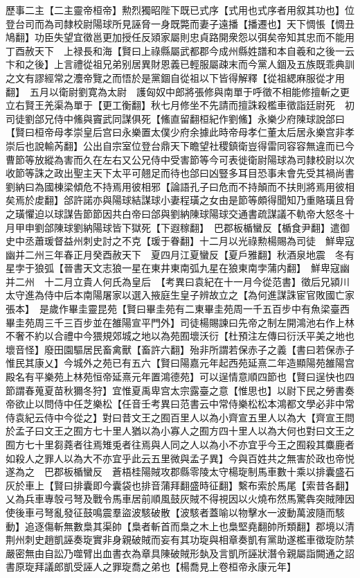 歷事二主【二主靈帝桓帝】勲烈獨昭陛下既已式序【式用也式序者用叙其功也】位登台司而為司隸校尉陽球所見誣脅一身既斃而妻子遠播【播遷也】天下惆悵【惆丑鳩翻】功臣失望宜徵邕更加授任反熲家屬則忠貞路開衆怨以弭矣帝知其忠而不能用　丁酉赦天下　上禄長和海【賢曰上祿縣屬武都郡今成州縣姓譜和本自羲和之後一云卞和之後】上言禮從祖兄弟别居異財恩義已輕服屬疎末而今黨人錮及五族既乖典訓之文有謬經常之灋帝覽之而悟於是黨錮自從祖以下皆得解釋【從祖緦麻服從才用翻】　五月以衛尉劉寛為太尉　護匈奴中郎將張修與南單于呼徵不相能修擅斬之更立右賢王羌渠為單于【更工衡翻】秋七月修坐不先請而擅誅殺檻車徵詣廷尉死　初司徒劉郃兄侍中鯈與竇武同謀俱死【鯈直留翻桓紀作劉鯈】永樂少府陳球說郃曰【賢曰桓帝母孝崇皇后宫曰永樂置太僕少府余據此時帝母孝仁董太后居永樂宫非孝崇后也說輸芮翻】公出自宗室位登台鼎天下瞻望社稷鎮衛豈得雷同容容無違而已今曹節等放縱為害而久在左右又公兄侍中受害節等今可表徙衛尉陽球為司隸校尉以次收節等誅之政出聖主天下太平可翹足而待也郃曰凶豎多耳目恐事未會先受其禍尚書劉納曰為國棟梁傾危不持焉用彼相邪【論語孔子曰危而不持顛而不扶則將焉用彼相矣焉於䖍翻】郃許諾亦與陽球結謀球小妻程璜之女由是節等頗得聞知乃重賂璜且脅之璜懼迫以球謀告節節因共白帝曰郃與劉納陳球陽球交通書疏謀議不軌帝大怒冬十月甲申劉郃陳球劉納陽球皆下獄死【下遐稼翻】　巴郡板楯蠻反【楯食尹翻】遣御史中丞蕭瑗督益州刺史討之不克【瑗于眷翻】十二月以光祿勲楊賜為司徒　鮮卑寇幽并二州三年春正月癸酉赦天下　夏四月江夏蠻反【夏戶雅翻】秋酒泉地震　冬有星孛于狼弧【晉書天文志狼一星在東井東南弧九星在狼東南孛蒲内翻】　鮮卑寇幽并二州　十二月立貴人何氏為皇后　【考異曰袁紀在十一月今從范書】徵后兄潁川太守進為侍中后本南陽屠家以選入掖庭生皇子辨故立之【為何進謀誅宦官敗國亡家張本】　是歲作畢圭靈昆苑【賢曰畢圭苑有二東畢圭苑周一千五百步中有魚梁臺西畢圭苑周三千三百步並在雒陽宣平門外】司徒楊賜諫曰先帝之制左開鴻池右作上林不奢不約以合禮中今猥規郊城之地以為苑囿壞沃衍【杜預注左傳曰衍沃平美之地也壞音怪】廢田園驅居民畜禽獸【畜許六翻】殆非所謂若保赤子之義【書曰若保赤子惟民其康乂】今城外之苑已有五六【賢曰陽嘉元年起西苑延熹二年造顯陽苑雒陽宫殿名有平樂苑上林苑恒帝延熹元年置鴻德苑】可以逞情意順四節也【賢曰逞快也四節謂春蒐夏苗秋獮冬狩】宜惟夏禹卑宫太宗露臺之意【惟思也】以尉下民之勞書奏帝欲止以問侍中任芝樂松【任音壬考異曰范書云中常侍樂松松本鴻都文學必非中常侍袁紀云侍中今從之】對曰昔文王之囿百里人以為小齊宣五里人以為大【齊宣王問於孟子曰文王之囿方七十里人猶以為小寡人之囿方四十里人以為大何也對曰文王之囿方七十里芻蕘者往焉雉兎者往焉與人同之人以為小不亦宜乎今王之囿殺其麋鹿者如殺人之罪人以為大不亦宜乎此云五里微與孟子異】今與百姓共之無害於政也帝悦遂為之　巴郡板楯蠻反　蒼梧桂陽賊攻郡縣零陵太守楊琁制馬車數十乘以排囊盛石灰於車上【賢曰排囊即今囊袋也排音蒲拜翻盛時征翻】繫布索於馬尾【索昔各翻】乂為兵車專彀弓弩及戰令馬車居前順風鼓灰賊不得視因以火燒布然馬驚犇突賊陣因使後車弓弩亂發征鼓鳴震羣盜波駭破散【波駭者蓋喻以物擊水一波動萬波隨而駭動】追逐傷斬無數梟其渠帥【梟者斬首而梟之木上也梟堅堯翻帥所類翻】郡境以清荆州刺史趙凱誣奏琁實非身親破賊而妄有其功琁與相章奏凱有黨助遂檻車徵琁防禁嚴密無由自訟乃噬臂出血書衣為章具陳破賊形埶及言凱所誣狀潛令親屬詣闕通之詔書原琁拜議郎凱受誣人之罪琁喬之弟也【楊喬見上卷桓帝永康元年】

